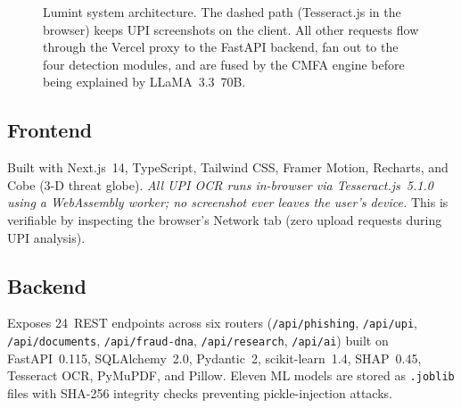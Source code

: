 \documentclass[conference]{IEEEtran}
\begin{document}
\begin{figure}[t]
\caption{Lumint system architecture. The dashed path (Tesseract.js in
the browser) keeps UPI screenshots on the client. All other requests
flow through the Vercel proxy to the FastAPI backend, fan out to the
four detection modules, and are fused by the CMFA engine before being
explained by LLaMA~3.3~70B.}
\label{fig:arch}
\end{figure}

\vspace{3mm}

\subsection{Frontend}
Built with Next.js~14, TypeScript, Tailwind CSS, Framer Motion,
Recharts, and Cobe (3-D threat globe). \emph{All UPI OCR runs in-browser
via Tesseract.js~5.1.0 using a WebAssembly worker; no screenshot ever
leaves the user's device.} This is verifiable by inspecting the
browser's Network tab (zero upload requests during UPI analysis).

\subsection{Backend}
Exposes 24~REST endpoints across six routers
(\texttt{/api/phishing}, \texttt{/api/upi}, \texttt{/api/documents},
\texttt{/api/fraud-dna}, \texttt{/api/research}, \texttt{/api/ai})
built on FastAPI~0.115, SQLAlchemy~2.0, Pydantic~2, scikit-learn~1.4,
SHAP~0.45, Tesseract OCR, PyMuPDF, and Pillow. Eleven ML models are
stored as \texttt{.joblib} files with SHA-256 integrity checks
preventing pickle-injection attacks.
\end{document}
